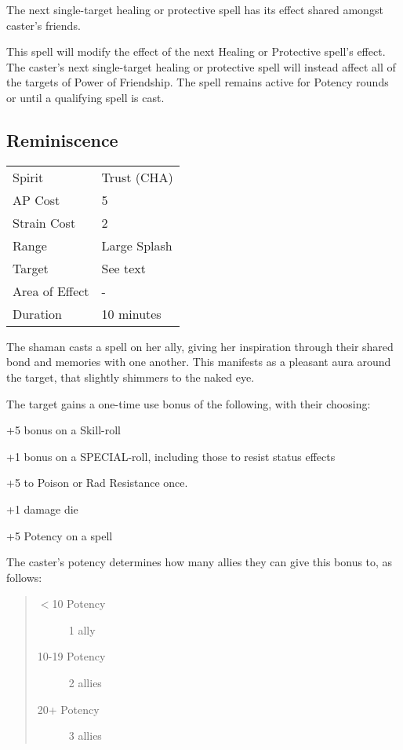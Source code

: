 \documentclass[11pt,a4paper,twocolumn]{book}
\begin{document}
\medskip

The next single-target healing or protective spell has its effect shared amongst caster's friends.

This spell will modify the effect of the next Healing or Protective spell's effect. The caster's next single-target healing or protective spell will instead affect all of the targets of Power of Friendship. The spell remains active for Potency rounds or until a qualifying spell is cast.




\subsection*{Reminiscence}
{
	\begin{tabu} to 70mm{| X[l,4] | X[l,7] |}
		\hline
		Spirit         & Trust (CHA)  \\
		AP Cost        & 5            \\
		Strain Cost    & 2            \\
		Range          & Large Splash \\
		Target         & See text     \\
		Area of Effect & -            \\
		Duration       & 10 minutes   \\ \hline
	\end{tabu}
	
}
\medskip

The shaman casts a spell on her ally, giving her inspiration through their shared bond and memories with one another. This manifests as a pleasant aura around the target, that slightly shimmers to the naked eye. 

The target gains a one-time use bonus of the following, with their choosing:
\begin{compactitem}
	\item +5 bonus on a Skill-roll
	\item +1 bonus on a SPECIAL-roll, including those to resist status effects
	\item +5 to Poison or Rad Resistance once.
	\item +1 damage die
	\item +5 Potency on a spell
\end{compactitem}

The caster's potency determines how many allies they can give this bonus to, as follows:
\begin{quote}
	\begin{description}
		\item[$<$10 Potency] 	1 ally
		\item[10-19 Potency] 	2 allies
		\item[20+ Potency] 		3 allies
	\end{description}	
\end{quote}
\end{document}
